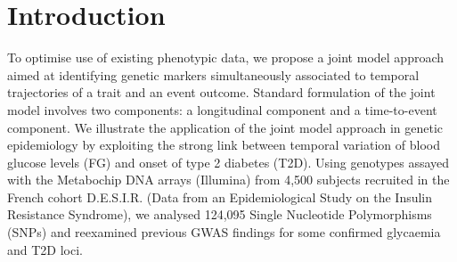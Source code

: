 \documentclass[10pt,a0,portrait]{a0poster}
\begin{document}




\color{SaddleBrown}
\section*{Introduction}
\vspace{-1.5cm}
\par{\large To optimise use of existing phenotypic data, we propose a joint model \citep{tsiatis2004} approach aimed at identifying genetic markers
simultaneously associated to temporal trajectories of a trait and an event outcome.
Standard formulation of the joint model involves two components: a longitudinal component and a time-to-event component.
We illustrate the application of the joint model approach in genetic epidemiology by exploiting the strong link
between temporal variation of blood glucose levels (FG) and onset of type 2 diabetes (T2D).
Using genotypes assayed with the Metabochip DNA arrays (Illumina) from 4,500 subjects recruited in the French cohort D.E.S.I.R. (Data from an Epidemiological Study on the Insulin Resistance Syndrome),
we analysed 124,095 Single Nucleotide Polymorphisms (SNPs) and reexamined previous GWAS findings for some confirmed glycaemia and T2D loci.}
\end{document}
